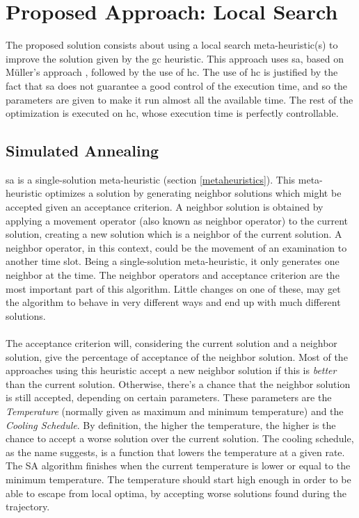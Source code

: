 \chapter{Proposed Approach: Local Search}
\label{sec:LocalSearch}
\thispagestyle{plain}

The proposed solution consists about using a local search meta-heuristic(s) to improve the solution given by the \gls{gc} heuristic. This approach uses \gls{sa}, based on M\"{u}ller's approach \cite{Mueller2009}, followed by the use of \gls{hc}. The use of \gls{hc} is justified by the fact that \gls{sa} does not guarantee a good control of the execution time, and so the parameters are given to make it run almost all the available time. The rest of the optimization is executed on \gls{hc}, whose execution time is perfectly controllable.

\section{Simulated Annealing}
\label{sec:SimulatedAnnealing}

\gls{sa} is a single-solution meta-heuristic (section \ref{metaheuristics}). This meta-heuristic optimizes a solution by generating neighbor solutions which might be accepted given an acceptance criterion. A neighbor solution is obtained by applying a movement operator (also known as neighbor operator) to the current solution, creating a new solution which is a neighbor of the current solution. A neighbor operator, in this context, could be the movement of an examination to another time slot. Being a single-solution meta-heuristic, it only generates one neighbor at the time. The neighbor operators and acceptance criterion are the most important part of this algorithm. Little changes on one of these, may get the algorithm to behave in very different ways and end up with much different solutions.\\
\\
The acceptance criterion will, considering the current solution and a neighbor solution, give the percentage of acceptance of the neighbor solution. Most of the approaches using this heuristic accept a new neighbor solution if this is \textit{better} than the current solution. Otherwise, there's a chance that the neighbor solution is still accepted, depending on certain parameters. These parameters are the \textit{Temperature} (normally given as maximum and minimum temperature) and the \textit{Cooling Schedule}. By definition, the higher the temperature, the higher is the chance to accept a worse solution over the current solution. The cooling schedule, as the name suggests, is a function that lowers the temperature at a given rate. The SA algorithm finishes when the current temperature is lower or equal to the minimum temperature. The temperature should start high enough in order to be able to escape from local optima, by accepting worse solutions found during the trajectory.

